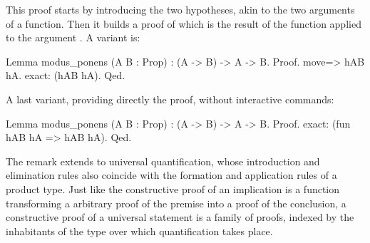 This proof starts by introducing the two hypotheses, 
akin to the two arguments of a function. Then it builds a proof of 
 which is the result of the function  applied to the argument .
A variant is:

\begin{coq}{}{}
Lemma modus_ponens (A B : Prop) : (A -> B) -> A -> B.
Proof.
move=> hAB hA.
exact: (hAB hA).
Qed.
\end{coq}

A last variant, providing directly the proof, without interactive commands:

\begin{coq}{}{}
Lemma modus_ponens (A B : Prop) : (A -> B) -> A -> B.
Proof.
exact: (fun hAB hA => hAB hA).
Qed.
\end{coq}

The remark extends to universal quantification, whose introduction and
elimination rules also coincide with the formation and application
rules of a product type. Just like the constructive proof of an
implication is a function transforming a arbitrary proof of the
premise into a proof of the conclusion, a constructive proof of a
universal statement is a family of proofs, indexed by the inhabitants
of the type over which quantification takes place.








